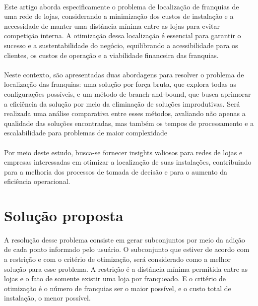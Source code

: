 \documentclass[12pt]{article}
\begin{document}
\paragraph{}Este artigo aborda especificamente o problema de localização de franquias de uma rede de lojas, considerando a minimização dos custos de instalação e a necessidade de manter uma distância mínima entre as lojas para evitar competição interna. A otimização dessa localização é essencial para garantir o sucesso e a sustentabilidade do negócio, equilibrando a acessibilidade para os clientes, os custos de operação e a viabilidade financeira das franquias.

\paragraph{}Neste contexto, são apresentadas duas abordagens para resolver o problema de localização das franquias: uma solução por força bruta, que explora todas as configurações possíveis, e um método de branch-and-bound, que busca aprimorar a eficiência da solução por meio da eliminação de soluções improdutivas. Será realizada uma análise comparativa entre esses métodos, avaliando não apenas a qualidade das soluções encontradas, mas também os tempos de processamento e a escalabilidade para problemas de maior complexidade

\paragraph{}Por meio deste estudo, busca-se fornecer insights valiosos para redes de lojas e empresas interessadas em otimizar a localização de suas instalações, contribuindo para a melhoria dos processos de tomada de decisão e para o aumento da eficiência operacional.

\section{Solução proposta}

\paragraph{}A resolução desse problema consiste em gerar subconjuntos por meio da adição de cada ponto informado pelo usuário. O subconjunto que estiver de acordo com a restrição e com o critério de otimização, será considerado como a melhor solução para esse problema. A restrição é a distância mínima permitida entre as lojas e o fato de somente existir uma loja por franqueado. E o critério de otimização é o número de franquias ser o maior possível, e o custo total de instalação, o menor possível.
\end{document}
